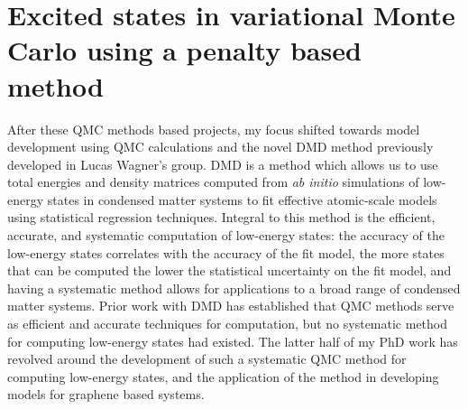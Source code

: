 \documentclass{article}
\begin{document}
\section{Excited states in variational Monte Carlo using a penalty based method}
After these QMC methods based projects, my focus shifted towards model development using QMC calculations and the novel DMD method previously developed in Lucas Wagner's group.
DMD is a method which allows us to use total energies and density matrices computed from \textit{ab initio} simulations of low-energy states in condensed matter systems to fit effective atomic-scale models using statistical regression techniques.
Integral to this method is the efficient, accurate, and systematic computation of low-energy states: the accuracy of the low-energy states correlates with the accuracy of the fit model,  the more states that can be computed the lower the statistical uncertainty on the fit model, and having a systematic method allows for applications to a broad range of condensed matter systems.
Prior work with DMD has established that QMC methods serve as efficient and accurate techniques for computation, but no systematic method for computing low-energy states had existed.
The latter half of my PhD work has revolved around the development of such a systematic QMC method for computing low-energy states, and the application of the method in developing models for graphene based systems.
\end{document}
